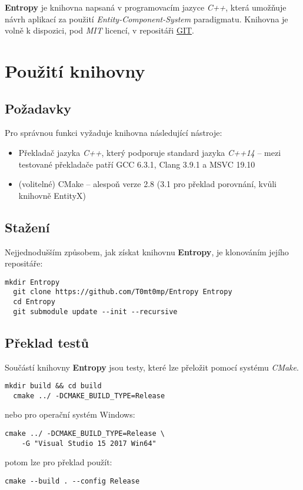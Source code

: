 \textbf{Entropy} je knihovna napsaná v programovacím jazyce \emph{C++}, která umožňuje návrh aplikací za použití \emph{Entity-Component-System} paradigmatu. Knihovna je volně k dispozici, pod \emph{MIT} licencí, v repositáři \href{https://github.com/T0mt0mp/Entropy}{GIT}. 

\section*{Použití knihovny}

\subsection*{Požadavky}

Pro správnou funkci vyžaduje knihovna následující nástroje: 
\begin{itemize}
	\item Překladač jazyka \emph{C++}, který podporuje standard jazyka \emph{C++14} -- mezi testované překladače patří GCC 6.3.1, Clang 3.9.1 a MSVC 19.10
	\item (volitelné) CMake -- alespoň verze 2.8 (3.1 pro překlad porovnání, kvůli knihovně EntityX)
\end{itemize}

\subsection*{Stažení}

Nejjednodušším způsobem, jak získat knihovnu \textbf{Entropy}, je klonováním jejího repositáře:

\begin{lstlisting}[basicstyle=\ttfamily]
  mkdir Entropy
  git clone https://github.com/T0mt0mp/Entropy Entropy
  cd Entropy
  git submodule update --init --recursive
\end{lstlisting}

\subsection*{Překlad testů}

Součástí knihovny \textbf{Entropy} jsou testy, které lze přeložit pomocí systému \emph{CMake}. 

\begin{lstlisting}[basicstyle=\ttfamily]
  mkdir build && cd build
  cmake ../ -DCMAKE_BUILD_TYPE=Release
\end{lstlisting}
nebo pro operační systém Windows:
\begin{lstlisting}[basicstyle=\ttfamily]
  cmake ../ -DCMAKE_BUILD_TYPE=Release \
    -G "Visual Studio 15 2017 Win64"
\end{lstlisting}
\pagebreak
potom lze pro překlad použít:
\begin{lstlisting}[basicstyle=\ttfamily]
  cmake --build . --config Release
\end{lstlisting}

